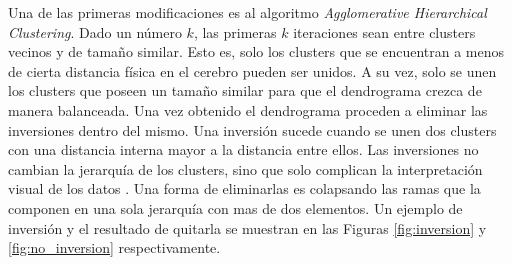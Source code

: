 Una de las primeras modificaciones es al algoritmo 
\textit{Agglomerative Hierarchical Clustering}. Dado un n\'umero $k$,
las primeras $k$ iteraciones sean entre clusters vecinos y de tama\~no similar.
Esto es, solo los clusters que se encuentran a menos de cierta distancia f\'isica
en el cerebro pueden ser unidos. A su vez, solo se unen los clusters que poseen
un tama\~no similar para que el dendrograma crezca de manera balanceada. 
Una vez obtenido el dendrograma proceden a eliminar las inversiones dentro del
mismo. Una inversi\'on sucede cuando se unen dos clusters con una distancia 
interna mayor a la distancia entre ellos. Las inversiones no cambian la 
jerarqu\'ia de los clusters, sino que solo complican la interpretaci\'on visual
de los datos \cite{Murtagh1985}. Una forma de eliminarlas es colapsando las 
ramas que la componen en una sola jerarqu\'ia con mas de dos elementos. Un 
ejemplo de inversi\'on y el resultado de quitarla se muestran en las Figuras 
\ref{fig:inversion} y \ref{fig:no_inversion} respectivamente. 


